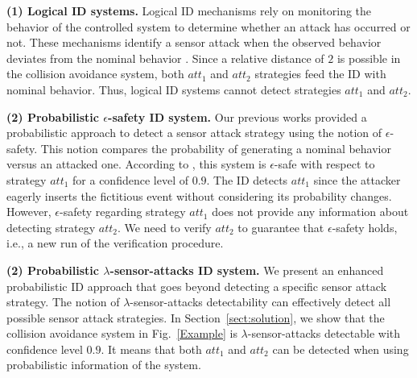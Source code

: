 \noindent \textbf{(1) Logical ID systems.} 
Logical ID mechanisms rely on monitoring the behavior of the controlled system to determine whether an attack has occurred or not. 
These mechanisms identify a sensor attack when the observed behavior deviates from the nominal behavior \citep{Carvalho:2018, Lima:2019, lin2024diagnosability}. 
Since a relative distance of $2$ is possible in the collision avoidance system, both $att_1$ and $att_2$ strategies feed the ID with nominal behavior.
Thus, logical ID systems cannot detect strategies $att_1$ and $att_2$.

\noindent \textbf{(2) Probabilistic $\epsilon$-safety ID system.} 
Our previous works \citep{meira-goes:2020towards, Fahim2024-wodes} provided a probabilistic approach to detect a sensor attack strategy using the notion of $\epsilon$-safety. 
This notion compares the probability of generating a nominal behavior versus an attacked one.
According to \citep{Fahim2024-wodes}, this system is $\epsilon$-safe with respect to strategy $att_1$ for a confidence level of $0.9$.
The ID detects $att_1$ since the attacker eagerly inserts the fictitious event without considering its probability changes.
However, $\epsilon$-safety regarding strategy $att_1$ does not provide any information about detecting strategy $att_2$.
We need to verify $att_2$ to guarantee that $\epsilon$-safety holds, i.e., a new run of the verification procedure.

\noindent \textbf{(2) Probabilistic $\lambda$-sensor-attacks ID system.} 
We present an enhanced probabilistic ID approach that goes beyond detecting a specific sensor attack strategy. 
The notion of $\lambda$-sensor-attacks detectability can effectively detect all possible sensor attack strategies.
In Section~\ref{sect:solution}, we show that the collision avoidance system in Fig.~\ref{Example} is $\lambda$-sensor-attacks detectable with confidence level $0.9$.
It means that both $att_1$ and $att_2$ can be detected when using probabilistic information of the system.
